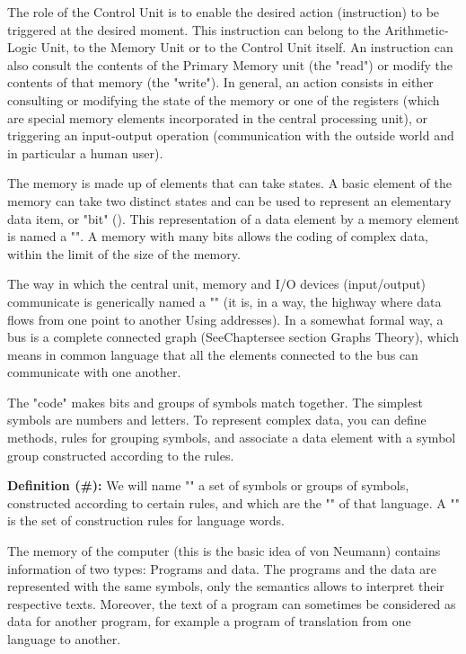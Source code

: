 	The role of the Control Unit is to enable the desired action (instruction) to be triggered at the desired moment. This instruction can belong to the Arithmetic-Logic Unit, to the Memory Unit or to the Control Unit itself. An instruction can also consult the contents of the Primary Memory unit (the "read") or modify the contents of that memory (the "write"). In general, an action consists in either consulting or modifying the state of the memory or one of the registers (which are special memory elements incorporated in the central processing unit), or triggering an input-output operation (communication with the outside world and in particular a human user).
	
	The memory is made up of elements that can take states. A basic element of the memory can take two distinct states and can be used to represent an elementary data item, or "bit" (). This representation of a data element by a memory element is named a "". A memory with many bits allows the coding of complex data, within the limit of the size of the memory.

	The way in which the central unit, memory and I/O devices (input/output) communicate is generically named a "" (it is, in a way, the highway where data flows from one point to another Using addresses). In a somewhat formal way, a bus is a complete connected graph (SeeChapter{see section Graphs Theory}), which means in common language that all the elements connected to the bus can communicate with one another.
	\begin{tcolorbox}[title=Remark,colframe=black,arc=10pt]
	The "code" makes bits and groups of symbols match together. The simplest symbols are numbers and letters. To represent complex data, you can define methods, rules for grouping symbols, and associate a data element with a symbol group constructed according to the rules.
	\end{tcolorbox}
	\textbf{Definition (\#\mydef):} We will name "" a set of symbols or groups of symbols, constructed according to certain rules, and which are the "" of that language. A "" is the set of construction rules for language words.
	
	The memory of the computer (this is the basic idea of von Neumann) contains information of two types: Programs and data. The programs and the data are represented with the same symbols, only the semantics allows to interpret their respective texts. Moreover, the text of a program can sometimes be considered as data for another program, for example a program of translation from one language to another.
	
